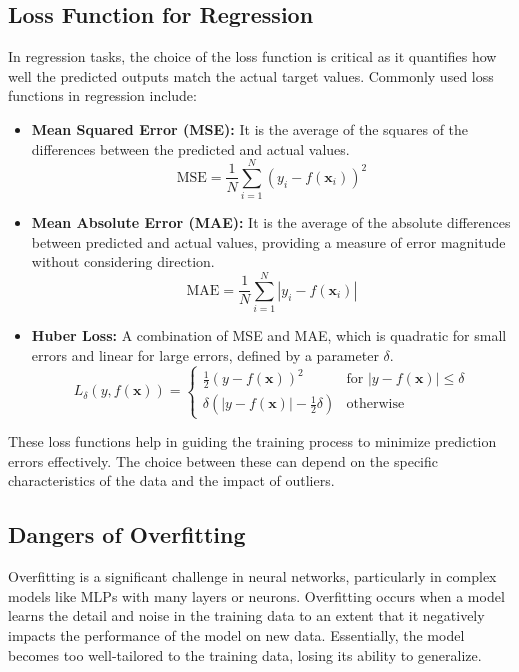 \documentclass[12pt]{article}
\begin{document}
\subsection{Loss Function for Regression}
In regression tasks, the choice of the loss function is critical as it quantifies how well the predicted outputs match the actual target values. Commonly used loss functions in regression include:
\begin{itemize}
    \item \textbf{Mean Squared Error (MSE):} It is the average of the squares of the differences between the predicted and actual values.
    \begin{equation}
    \text{MSE} = \frac{1}{N} \sum_{i=1}^N (y_i - f(\mathbf{x}_i))^2
    \end{equation}
    \item \textbf{Mean Absolute Error (MAE):} It is the average of the absolute differences between predicted and actual values, providing a measure of error magnitude without considering direction.
    \begin{equation}
    \text{MAE} = \frac{1}{N} \sum_{i=1}^N |y_i - f(\mathbf{x}_i)|
    \end{equation}
    \item \textbf{Huber Loss:} A combination of MSE and MAE, which is quadratic for small errors and linear for large errors, defined by a parameter $\delta$.
    \begin{equation}
    L_\delta(y, f(\mathbf{x})) = \begin{cases} 
    \frac{1}{2}(y - f(\mathbf{x}))^2 & \text{for } |y - f(\mathbf{x})| \leq \delta \\
    \delta(|y - f(\mathbf{x})| - \frac{1}{2}\delta) & \text{otherwise}
    \end{cases}
    \end{equation}
\end{itemize}

These loss functions help in guiding the training process to minimize prediction errors effectively. The choice between these can depend on the specific characteristics of the data and the impact of outliers.


\subsection{Dangers of Overfitting}
Overfitting is a significant challenge in neural networks, particularly in complex models like MLPs with many layers or neurons. Overfitting occurs when a model learns the detail and noise in the training data to an extent that it negatively impacts the performance of the model on new data. Essentially, the model becomes too well-tailored to the training data, losing its ability to generalize.
\end{document}
